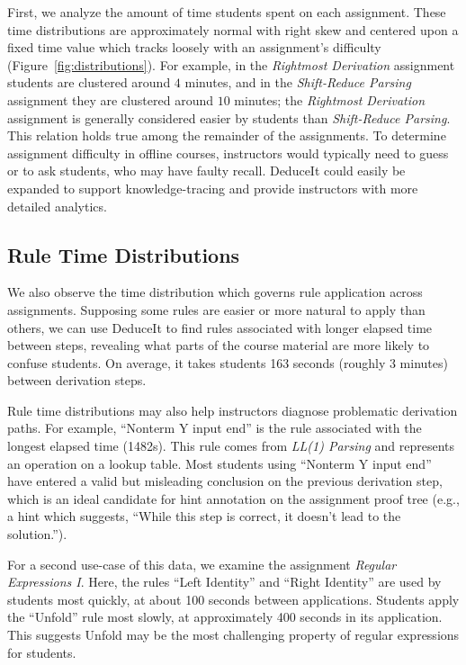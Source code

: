 \documentclass{sigchi}
\begin{document}
First, we analyze the amount of time students spent on each assignment. These time distributions are approximately normal with right skew and centered upon a fixed time value which tracks loosely with an assignment's difficulty (Figure~\ref{fig:distributions}). For example, in the \textit{Rightmost Derivation} assignment students are clustered around $4$ minutes, and in the \textit{Shift-Reduce Parsing} assignment they are clustered around $10$ minutes; the \textit{Rightmost Derivation} assignment is generally considered easier by students than \textit{Shift-Reduce Parsing}. This relation holds true among the remainder of the assignments. To determine assignment difficulty in offline courses, instructors would typically need to guess or to ask students, who may have faulty recall. DeduceIt could easily be expanded to support knowledge-tracing \cite{k-tracing} and provide instructors with more detailed analytics.

\subsection{Rule Time Distributions}

We also observe the time distribution which governs rule application across assignments. Supposing some rules are easier or more natural to apply than others, we can use DeduceIt to find rules associated with longer elapsed time between steps, revealing what parts of the course material are more likely to confuse students. On average, it takes students 163 seconds (roughly 3 minutes) between derivation steps. 

Rule time distributions may also help instructors diagnose problematic derivation paths. For example, ``Nonterm Y input end'' is the rule associated with the longest elapsed time (1482s). This rule comes from \textit{LL(1) Parsing} and represents an operation on a lookup table. Most students using ``Nonterm Y input end'' have entered a valid but misleading conclusion on the previous derivation step, which is an ideal candidate for hint annotation on the assignment proof tree (e.g., a hint which suggests, ``While this step is correct, it doesn't lead to the solution.''). %

For a second use-case of this data, we examine the assignment \textit{Regular Expressions I}. Here, the rules ``Left Identity'' and ``Right Identity'' are used by students most quickly, at about 100 seconds between applications. Students apply the ``Unfold'' rule most slowly, at approximately 400 seconds in its application. This suggests Unfold may be the most challenging property of regular expressions for students. 
\end{document}
